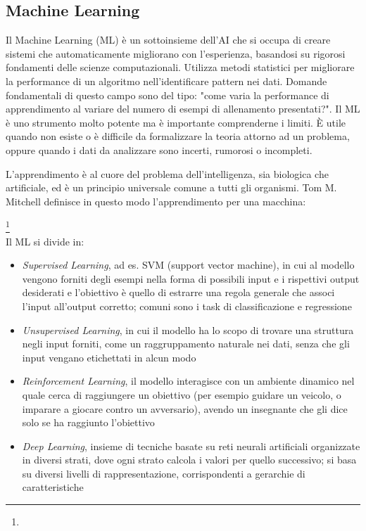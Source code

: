 \subsection{Machine Learning}

Il Machine Learning (ML) è un sottoinsieme dell'AI che si occupa di creare sistemi che automaticamente migliorano con l'esperienza, basandosi su rigorosi fondamenti delle scienze computazionali. Utilizza metodi statistici per migliorare la performance di un algoritmo nell'identificare pattern nei dati. Domande fondamentali di questo campo sono del tipo: "come varia la performance di apprendimento al variare del numero di esempi di allenamento presentati?". Il ML è uno strumento molto potente ma è importante comprenderne i limiti. È utile quando non esiste o è difficile da formalizzare la teoria attorno ad un problema, oppure quando i dati da analizzare sono incerti, rumorosi o incompleti.

\par L'apprendimento è al cuore del problema dell'intelligenza, sia biologica che artificiale, ed è un principio universale comune a tutti gli organismi. Tom M. Mitchell definisce in questo modo l'apprendimento per una macchina:

\footnote{} \\

Il ML si divide in:

\begin{itemize}
	\item \textit{Supervised Learning}, ad es. SVM (support vector machine), in cui al modello vengono forniti degli esempi nella forma di possibili input e i rispettivi output desiderati e l'obiettivo è quello di estrarre una regola generale che associ l'input all'output corretto; comuni sono i task di classificazione e regressione \\
	
	\item \textit{Unsupervised Learning}, in cui il modello ha lo scopo di trovare una struttura negli input forniti, come un raggruppamento naturale nei dati, senza che gli input vengano etichettati in alcun modo \\
	
	\item \textit{Reinforcement Learning}, il modello interagisce con un ambiente dinamico nel quale cerca di raggiungere un obiettivo (per esempio guidare un veicolo, o imparare a giocare contro un avversario), avendo un insegnante che gli dice solo se ha raggiunto l'obiettivo \\
	
	\item \textit{Deep Learning}, insieme di tecniche basate su reti neurali artificiali organizzate in diversi strati, dove ogni strato calcola i valori per quello successivo; si basa su diversi livelli di rappresentazione, corrispondenti a gerarchie di caratteristiche
\end{itemize}

